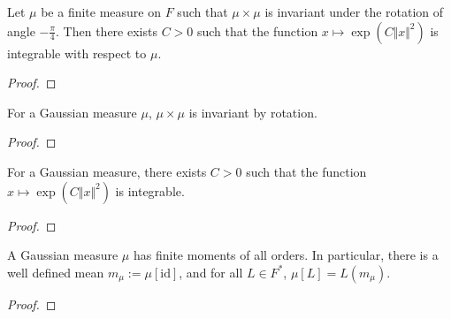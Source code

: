 \begin{theorem}\label{thm:exists_integrable_exp_sq_of_map_rotation_eq_self}
  \leanok
Let $\mu$ be a finite measure on $F$ such that $\mu \times \mu$ is invariant under the rotation of angle $-\frac{\pi}{4}$.
Then there exists $C > 0$ such that the function $x \mapsto \exp (C \Vert x \Vert ^ 2)$ is integrable with respect to $\mu$.
\end{theorem}

\begin{proof}\leanok

\end{proof}


\begin{lemma}\label{lem:IsGaussian.map_rotation_eq_self}
  \leanok
For a Gaussian measure $\mu$, $\mu \times \mu$ is invariant by rotation.
\end{lemma}

\begin{proof}\leanok

\end{proof}


\begin{theorem}\label{thm:IsGaussian.exists_integrable_exp_sq}
  \leanok
For a Gaussian measure, there exists $C > 0$ such that the function $x \mapsto \exp (C \Vert x \Vert ^ 2)$ is integrable.
\end{theorem}

\begin{proof}\leanok

\end{proof}


\begin{lemma}\label{lem:IsGaussian.memLp_id}
  \leanok
A Gaussian measure $\mu$ has finite moments of all orders.
In particular, there is a well defined mean $m_\mu := \mu[\mathrm{id}]$, and for all $L \in F^*$, $\mu[L] = L(m_\mu)$.
\end{lemma}

\begin{proof}\leanok

\end{proof}


